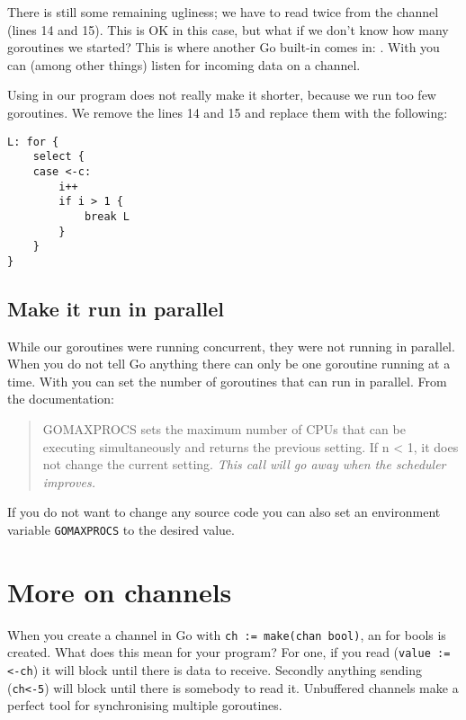 \showremarks
There is still some remaining ugliness; we have to read twice from
the channel (lines 14 and 15). This is OK in this case, but what if
we don't know how many goroutines we started? This is where another
Go built-in comes in: . With  you 
can (among other things) listen for incoming data on a channel.

Using  in our program does not really make it shorter,
because we run too few goroutines. We remove the lines 14 and 15 and
replace them with the following:
\begin{lstlisting}[caption=Using \key{select},numbers=right,firstnumber=14]
L: for {
	select {
	case <-c:
		i++ 
		if i > 1 { 
			break L
		}   
	}   
}   
\end{lstlisting}

\subsection{Make it run in parallel}
While our goroutines were running concurrent, they were not running in
parallel. When you do not tell Go anything there can only be one
goroutine running at a time. With  you
can set the number of goroutines that can run in parallel. From
the documentation:
\begin{quote}
GOMAXPROCS sets the maximum number of CPUs that can be executing
simultaneously and returns the previous setting. If n < 1, it does not
change the current setting. \emph{This call will go away when the scheduler
improves.}
\end{quote}
If you do not want to change any source code you can also set an
environment variable \verb|GOMAXPROCS| to the desired value.

\section{More on channels}
\label{sec:more on channels}
When you create a channel in Go with \lstinline{ch := make(chan bool)}, 
an  for
bools is created. What does this mean for your program? For one, if you
read (\lstinline{value := <-ch}) it will block until there is data to
receive. Secondly anything sending (\lstinline{ch<-5}) will block until there
is somebody to read it. 
Unbuffered channels make a perfect tool for synchronising multiple
goroutines.

